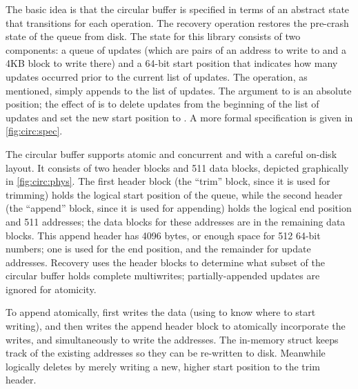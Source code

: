 The basic idea is that the circular buffer is specified in terms of an abstract
state that transitions for each operation. The recovery operation
restores the pre-crash state of the queue from disk. The state for this library consists
of two components: a queue of updates (which are pairs of an address to write to
and a 4KB block to write there) and a 64-bit start position that indicates how
many updates occurred prior to the current list of updates. The  operation, as
mentioned, simply appends to the list of updates. The argument to 
is an absolute position; the effect of  is to delete
 updates from the beginning of the list of updates and set the
new start position to . A more formal specification is given in
\cref{fig:circ:spec}.

The circular buffer supports atomic and concurrent  and 
with a careful on-disk layout. It consists of two header blocks and 511 data
blocks, depicted graphically in \cref{fig:circ:phys}. The first header block
(the ``trim'' block, since it is used for trimming) holds the logical start
position of the queue, while the second header (the ``append'' block, since it
is used for appending) holds the logical end position and 511 addresses; the
data blocks for these addresses are in the remaining data blocks. This append
header has 4096 bytes, or enough space for 512 64-bit numbers; one is used for
the end position, and the remainder for update addresses. Recovery uses the
header blocks to determine what subset of the circular buffer holds complete
multiwrites; partially-appended updates are ignored for atomicity.

To append atomically,  first writes the data (using
 to know where to start writing), and then writes the append header
block to atomically incorporate the writes, and simultaneously to write the
addresses. The in-memory  struct keeps track of the existing
addresses so they can be re-written to disk. Meanwhile  logically
deletes by merely writing a new, higher start position to the trim header.

